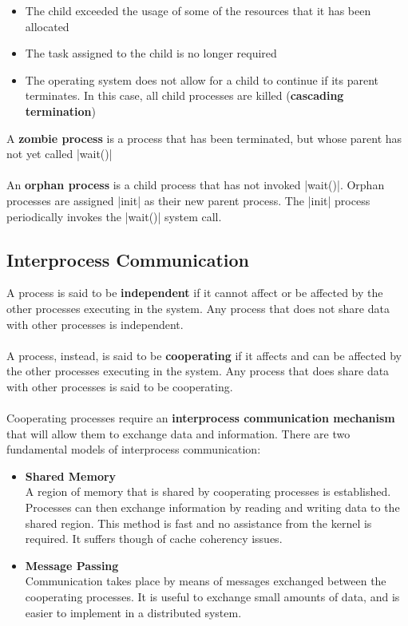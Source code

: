 \documentclass{article}
\begin{document}
\begin{itemize}
	\item The child exceeded the usage of some of the resources that it has been allocated
	\item The task assigned to the child is no longer required
	\item The operating system does not allow for a child to continue if its parent terminates. In this case, all child processes are killed (\textbf{cascading termination})
\end{itemize}
A \textbf{zombie process} is a process that has been terminated, but whose parent has not yet called \cverb|wait()| \\ \\
An \textbf{orphan process} is a child process that has not invoked \cverb|wait()|. Orphan processes are assigned \cverb|init| as their new parent process. The \cverb|init| process periodically invokes the \cverb|wait()| system call.

\subsection{Interprocess Communication}
A process is said to be \textbf{independent} if it cannot affect or be affected by the other processes executing in the system. Any process that does not share data with other processes is independent. \\ \\
A process, instead, is said to be \textbf{cooperating} if it affects and can be affected by the other processes executing in the system. Any process that does share data with other processes is said to be cooperating. \\ \\
Cooperating processes require an \textbf{interprocess communication mechanism} that will allow them to exchange data and information. There are two fundamental models of interprocess communication:

\begin{itemize}
	\item \textbf{Shared Memory}
	\vspace{.2cm} \\
	A region of memory that is shared by cooperating processes is established. Processes can then exchange information by reading and writing data to the shared region. This method is fast and no assistance from the kernel is required. It suffers though of cache coherency issues.
	
	\item \textbf{Message Passing}
	\vspace{.2cm} \\
	Communication takes place by means of messages exchanged between the cooperating processes. It is useful to exchange small amounts of data, and is easier to implement in a distributed system.
\end{itemize}
\end{document}
